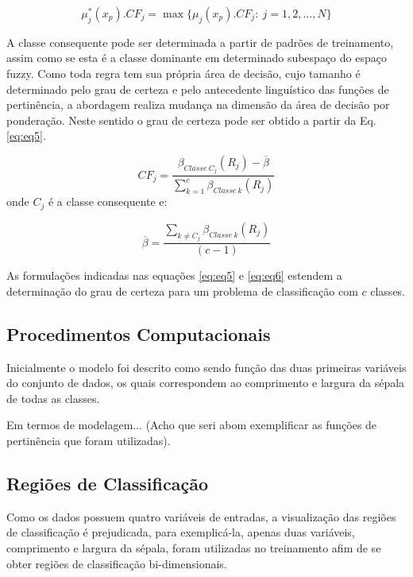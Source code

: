\documentclass[12pt,a4paper]{article}
\numberwithin{equation}{section}
\begin{document}
\begin{equation} \label{eq:eq4}
\mu_{j}^{ *}(x_{p}).CF_{j}=\max\lbrace\mu_{j}(x_{p}).CF_{j}:~j=1,2,...,N\rbrace
\end{equation}

A classe consequente pode ser determinada a partir de padrões de treinamento, assim como se esta é a classe dominante em determinado subespaço do espaço fuzzy. Como toda regra tem sua própria área de decisão, cujo tamanho é determinado pelo grau de certeza e pelo antecedente linguístico das funções de pertinência, a abordagem realiza mudança na dimensão da área de decisão por ponderação. Neste sentido o grau de certeza pode ser obtido a partir da Eq. \eqref{eq:eq5}.

\begin{equation} \label{eq:eq5}
CF_{j}=\frac{\beta_{Classe~C_{j}}(R_{j})-\overline{\beta}}{\sum_{k=1}^{c}\beta_{Classe~k}(R_{j})}
\end{equation}
onde $C_{j}$ é a classe consequente e:

\begin{equation} \label{eq:eq6}
\overline{\beta}=\frac{\sum_{k\neq C_{j}}\beta_{Classe~k}(R_{j})}{(c-1)}
\end{equation}

As formulações indicadas nas equações \eqref{eq:eq5} e \eqref{eq:eq6} estendem a determinação do grau de certeza para um problema de classificação com $c$ classes.

\subsection{Procedimentos Computacionais} \label{PC}

Inicialmente o modelo foi descrito como sendo função das duas primeiras variáveis do conjunto de dados, os quais correspondem ao comprimento e largura da sépala de todas as classes.

Em termos de modelagem... (Acho que seri abom exemplificar as funções de pertinência que foram utilizadas).

\subsection{Regiões de Classificação}

Como os dados possuem quatro variáveis de entradas, a visualização das regiões de classificação é prejudicada, para exemplicá-la, apenas duas variáveis, comprimento e largura da sépala, foram utilizadas no treinamento afim de se obter regiões de classificação bi-dimensionais.
\end{document}
